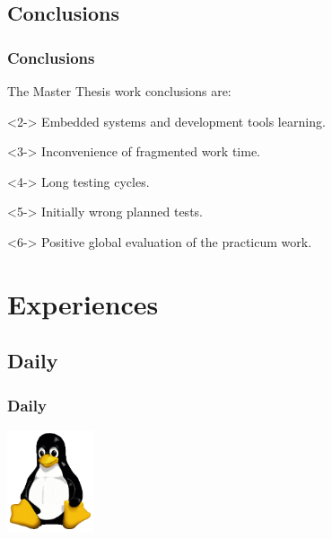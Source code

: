 \documentclass[slidestop,compress,mathserif]{beamer}
\begin{document}
\subsection{Conclusions}
\begin{frame}
  \frametitle{Conclusions}

  The Master Thesis work conclusions are:

  \begin{block}{}<2->
    Embedded systems and development tools learning.
  \end{block}

  \begin{block}{}<3->
    Inconvenience of fragmented work time.
  \end{block}

  \begin{block}{}<4->
    Long testing cycles.
  \end{block}

  \begin{block}{}<5->
    Initially wrong planned tests.
  \end{block}

  \begin{block}{}<6->
    Positive global evaluation of the practicum work.
  \end{block}
\end{frame}

\section{Experiences}
\subsection{Daily}
\begin{frame}
  \frametitle{Daily}
  
  

  \vspace*{\fill}
  \begin{center}
    \includegraphics[height=3cm]{images/Tux.png}
  \end{center}

\end{frame}
\end{document}
